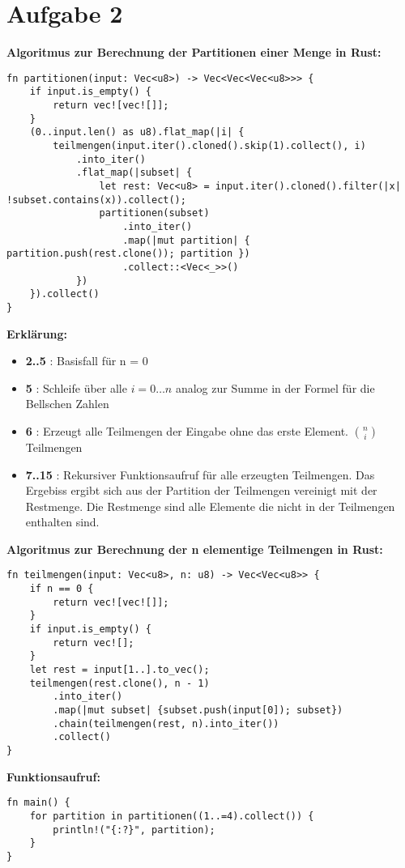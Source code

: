 \documentclass[a4paper]{scrartcl}
\begin{document}
\section*{Aufgabe 2}
\textbf{Algoritmus zur Berechnung der Partitionen einer Menge in Rust:}
\begin{lstlisting}
fn partitionen(input: Vec<u8>) -> Vec<Vec<Vec<u8>>> {
    if input.is_empty() {
        return vec![vec![]];
    }
    (0..input.len() as u8).flat_map(|i| {
        teilmengen(input.iter().cloned().skip(1).collect(), i)
            .into_iter()
            .flat_map(|subset| {
                let rest: Vec<u8> = input.iter().cloned().filter(|x| !subset.contains(x)).collect();
                partitionen(subset)
                    .into_iter()
                    .map(|mut partition| { partition.push(rest.clone()); partition })
                    .collect::<Vec<_>>()
            })
    }).collect()
} 
\end{lstlisting}
\textbf{Erklärung:}
\begin{itemize}
    \item \textbf{2..5} : Basisfall für n = 0
    \item \textbf{5} : Schleife über alle $ i = 0 \ldots n $ analog zur Summe in der Formel für die Bellschen Zahlen
    \item \textbf{6} : Erzeugt alle Teilmengen der Eingabe ohne das erste Element. $\binom{n}{i}$ Teilmengen
    \item \textbf{7..15} : Rekursiver Funktionsaufruf für alle erzeugten Teilmengen. Das Ergebiss ergibt sich aus der Partition der Teilmengen vereinigt mit der Restmenge. 
    Die Restmenge sind alle Elemente die nicht in der Teilmengen enthalten sind.
\end{itemize}

\textbf{Algoritmus zur Berechnung der n elementige Teilmengen in Rust:}
\begin{lstlisting}
fn teilmengen(input: Vec<u8>, n: u8) -> Vec<Vec<u8>> {
    if n == 0 {
        return vec![vec![]];
    }  
    if input.is_empty() {
        return vec![];
    }
    let rest = input[1..].to_vec();
    teilmengen(rest.clone(), n - 1)
        .into_iter()
        .map(|mut subset| {subset.push(input[0]); subset})
        .chain(teilmengen(rest, n).into_iter())
        .collect()
}
\end{lstlisting}

\textbf{Funktionsaufruf:}
\begin{lstlisting}
fn main() {
    for partition in partitionen((1..=4).collect()) {
        println!("{:?}", partition);
    }
}
\end{lstlisting}
\end{document}
